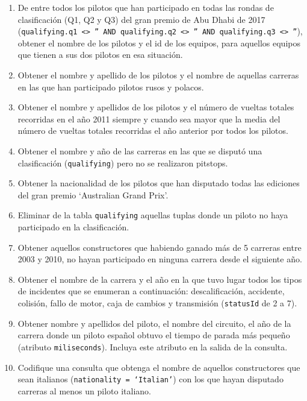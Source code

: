 \documentclass{db-practice}
\begin{document}
\begin{enumerate}
    \item De entre todos los pilotos que han participado en todas las rondas de clasificación (Q1, Q2 y Q3) del gran premio de Abu Dhabi de 2017 (\texttt{qualifying.q1 <> '' AND qualifying.q2 <> '' AND qualifying.q3 <> ''}), obtener el nombre de los pilotos y el id de los equipos, para aquellos equipos que tienen a sus dos pilotos en esa situación.
    
    \item Obtener el nombre y apellido de los pilotos y el nombre de aquellas carreras en las que han participado pilotos rusos y polacos.
            
    \item Obtener el nombre y apellidos de los pilotos y el número de vueltas totales recorridas en el año 2011 siempre y cuando sea mayor que la media del número de vueltas totales recorridas el año anterior por todos los pilotos.

    \item Obtener el nombre y año de las carreras en las que se disputó una clasificación (\texttt{qualifying}) pero no se realizaron pitstops.
    
    \item Obtener la nacionalidad de los pilotos que han disputado todas las ediciones del gran premio `Australian Grand Prix'.
    
    \item Eliminar de la tabla \texttt{qualifying} aquellas tuplas donde un piloto no haya participado en la clasificación.
            
    \item Obtener aquellos constructores que habiendo ganado más de 5 carreras entre 2003 y 2010, no hayan participado en ninguna carrera desde el siguiente año.
    
    \item Obtener el nombre de la carrera y el año en la que tuvo lugar todos los tipos de incidentes que se enumeran a continuación: descalificación, accidente, colisión, fallo de motor, caja de cambios y transmisión (\texttt{statusId} de 2 a 7).
    
    \item Obtener nombre y apellidos del piloto, el nombre del circuito, el año de la carrera donde un piloto español obtuvo el tiempo de parada más pequeño (atributo \texttt{miliseconds}). Incluya este atributo en la salida de la consulta.

    \item Codifique una consulta que obtenga el nombre de aquellos constructores que sean italianos (\texttt{nationality = `Italian'}) con los que hayan disputado carreras al menos un piloto italiano.
            

\end{enumerate}
\end{document}
